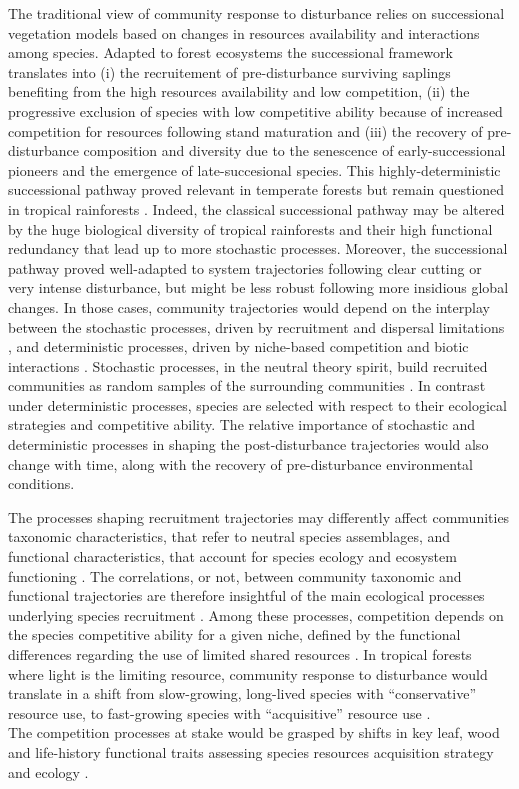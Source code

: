 \documentclass[fleqn,10pt]{ArtEcoFoG} %
\begin{document}
The traditional view of community response to disturbance relies on
successional vegetation models \citep{Clements1916} based on changes in
resources availability and interactions among species. Adapted to forest
ecosystems the successional framework translates into
\citep{Denslow2000} (i) the recruitement of pre-disturbance surviving
saplings benefiting from the high resources availability and low
competition, (ii) the progressive exclusion of species with low
competitive ability because of increased competition for resources
following stand maturation and (iii) the recovery of pre-disturbance
composition and diversity due to the senescence of early-successional
pioneers and the emergence of late-succesional species. This
highly-deterministic successional pathway proved relevant in temperate
forests but remain questioned in tropical rainforests
\citep{Norden2015}. Indeed, the classical successional pathway may be
altered by the huge biological diversity of tropical rainforests and
their high functional redundancy that lead up to more stochastic
processes. Moreover, the successional pathway proved well-adapted to
system trajectories following clear cutting or very intense disturbance,
but might be less robust following more insidious global changes. In
those cases, community trajectories would depend on the interplay
between the stochastic processes, driven by recruitment and dispersal
limitations \citep{Hubbell2001}, and deterministic processes, driven by
niche-based competition and biotic interactions \citep{Adler2007}.
Stochastic processes, in the neutral theory spirit, build recruited
communities as random samples of the surrounding communities
\citep{Hubbell2001, Chave2004}. In contrast under deterministic
processes, species are selected with respect to their ecological
strategies and competitive ability. The relative importance of
stochastic and deterministic processes in shaping the post-disturbance
trajectories would also change with time, along with the recovery of
pre-disturbance environmental conditions.

The processes shaping recruitment trajectories may differently affect
communities taxonomic characteristics, that refer to neutral species
assemblages, and functional characteristics, that account for species
ecology and ecosystem functioning \citep{Violle2007b, Kunstler2016}. The
correlations, or not, between community taxonomic and functional
trajectories are therefore insightful of the main ecological processes
underlying species recruitment \citep{Fukami2005}. Among these
processes, competition depends on the species competitive ability for a
given niche, defined by the functional differences regarding the use of
limited shared resources \citep{Perronne2017}. In tropical forests where
light is the limiting resource, community response to disturbance would
translate in a shift from slow-growing, long-lived species with
``conservative'' resource use, to fast-growing species with
``acquisitive'' resource use
\citep{Denslow1980, Molino2001, Bongers2009}.\\
The competition processes at stake would be grasped by shifts in key
leaf, wood and life-history functional traits assessing species
resources acquisition strategy and ecology
\citep{Wright2004, Chave2009b, Herault2011}.
\end{document}
